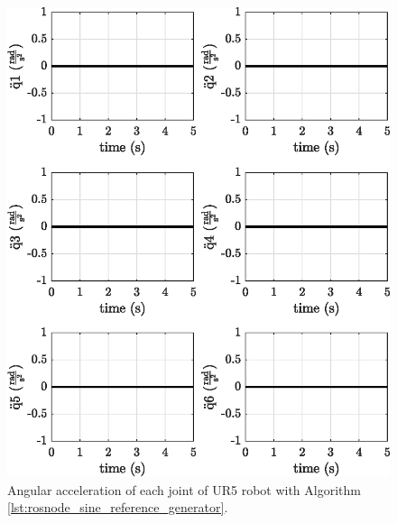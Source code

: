 \begin{figure}
    \centering
    \includegraphics{images/act_1.2/joint_acceleration.eps}
    \caption{Angular acceleration of each joint of UR5 robot with Algorithm \ref{lst:rosnode_sine_reference_generator}.}
    \label{fig:act_1.2_joint_acceleration}
\end{figure}